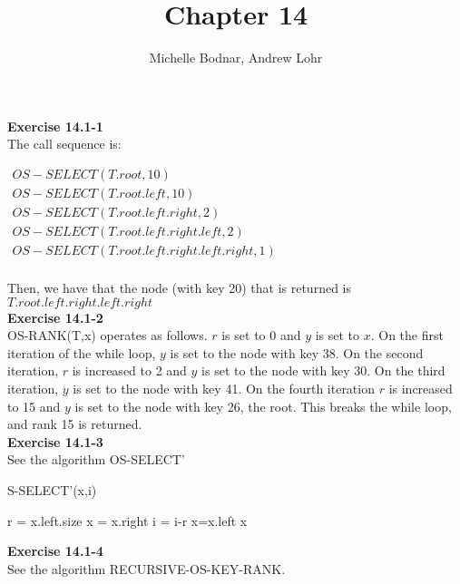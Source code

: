 \documentclass{article}
\title{Chapter 14}
\author{Michelle Bodnar, Andrew Lohr}
\begin{document}
\maketitle

\noindent\textbf{ Exercise 14.1-1} \\

The call sequence is:

$
\begin{array}{l}
OS-SELECT(T.root,10)\\
OS-SELECT(T.root.left,10)\\
OS-SELECT(T.root.left.right,2)\\
OS-SELECT(T.root.left.right.left,2)\\
OS-SELECT(T.root.left.right.left.right,1)\\
\end{array}
$

Then, we have that the node (with key 20) that is returned is $T.root.left.right.left.right$ \\

\noindent\textbf{Exercise 14.1-2}\\

OS-RANK(T,x) operates as follows.  $r$ is set to 0 and $y$ is set to $x$.  On the first iteration of the while loop, $y$ is set to the node with key 38.  On the second iteration, $r$ is increased to 2 and $y$ is set to the node with key 30.  On the third iteration, $y$ is set to the node with key 41.  On the fourth iteration $r$ is increased to 15 and $y$ is set to the node with key 26, the root.  This breaks the while loop, and rank 15 is returned. \\


\noindent\textbf{ Exercise 14.1-3} \\

See the algorithm OS-SELECT'
\begin{algorithm}
\caption OS-SELECT'(x,i)
\begin{algorithmic}
\State r = x.left.size
\State x = x.right
\State i = i-r
\Else
\State x=x.left
\EndIf
{}
\EndWhile
\State \Return x
\end{algorithmic}
\end{algorithm}

\noindent\textbf{Exercise 14.1-4}\\

See the algorithm RECURSIVE-OS-KEY-RANK.\\
\end{document}
